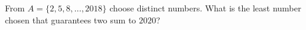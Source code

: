 From $A=\{2,5,8,\ldots,2018\}$ choose distinct numbers. What is the least number chosen that guarantees two sum to $2020$?
